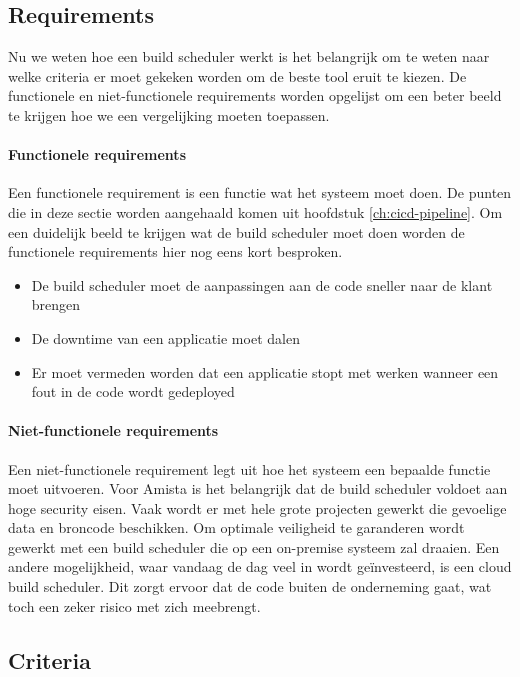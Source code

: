         
        
        \subsection{Requirements}
        Nu we weten hoe een build scheduler werkt is het belangrijk om te weten naar welke criteria er moet gekeken worden om de beste tool eruit te kiezen. De functionele en niet-functionele requirements worden opgelijst om een beter beeld te krijgen hoe we een vergelijking moeten toepassen.

            \paragraph{Functionele requirements}
            Een functionele requirement is een functie wat het systeem moet doen.
            De punten die in deze sectie worden aangehaald komen uit hoofdstuk \ref{ch:cicd-pipeline}. Om een duidelijk beeld te krijgen wat de build scheduler moet doen worden de functionele requirements hier nog eens kort besproken.
            \begin{itemize}
                \item De build scheduler moet de aanpassingen aan de code sneller naar de klant brengen
                \item De downtime van een applicatie moet dalen
                \item Er moet vermeden worden dat een applicatie stopt met werken wanneer een fout in de code wordt gedeployed
            \end{itemize}
            
            \paragraph{Niet-functionele requirements}
            Een niet-functionele requirement legt uit hoe het systeem een bepaalde functie moet uitvoeren. Voor Amista is het belangrijk dat de build scheduler voldoet aan hoge security eisen. Vaak wordt er met hele grote projecten gewerkt die gevoelige data en broncode beschikken. Om optimale veiligheid te garanderen wordt gewerkt met een build scheduler die op een on-premise systeem zal draaien. Een andere mogelijkheid, waar vandaag de dag veel in wordt geïnvesteerd, is een cloud build scheduler. Dit zorgt ervoor dat de code buiten de onderneming gaat, wat toch een zeker risico met zich meebrengt.

        \subsection{Criteria}
